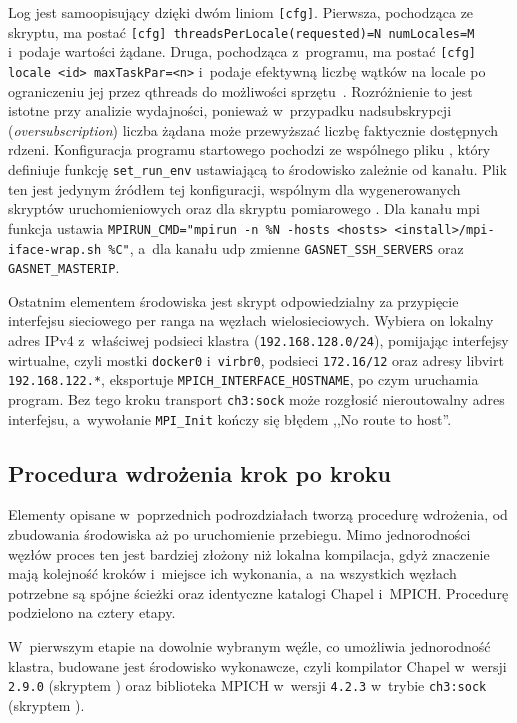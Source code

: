 Log jest samoopisujący dzięki dwóm liniom \texttt{[cfg]}. Pierwsza, pochodząca ze skryptu, ma postać \texttt{[cfg] threadsPerLocale(requested)=N numLocales=M} i~podaje wartości żądane. Druga, pochodząca z~programu, ma postać \texttt{[cfg] locale <id> maxTaskPar=<n>} i~podaje efektywną liczbę wątków na locale po ograniczeniu jej przez qthreads do możliwości sprzętu~\cite{qthreads}. Rozróżnienie to jest istotne przy analizie wydajności, ponieważ w~przypadku nadsubskrypcji (\emph{oversubscription}) liczba żądana może przewyższać liczbę faktycznie dostępnych rdzeni. Konfiguracja programu startowego pochodzi ze wspólnego pliku , który definiuje funkcję \texttt{set\_run\_env} ustawiającą to środowisko zależnie od kanału. Plik ten jest jedynym źródłem tej konfiguracji, wspólnym dla wygenerowanych skryptów uruchomieniowych oraz dla skryptu pomiarowego . Dla kanału mpi funkcja ustawia \texttt{MPIRUN\_CMD="mpirun -n \%N -hosts <hosts> <install>/mpi-iface-wrap.sh \%C"}, a~dla kanału udp zmienne \texttt{GASNET\_SSH\_SERVERS} oraz \texttt{GASNET\_MASTERIP}.

Ostatnim elementem środowiska jest skrypt  odpowiedzialny za przypięcie interfejsu sieciowego per ranga na węzłach wielosieciowych. Wybiera on lokalny adres IPv4 z~właściwej podsieci klastra (\texttt{192.168.128.0/24}), pomijając interfejsy wirtualne, czyli mostki \texttt{docker0} i~\texttt{virbr0}, podsieci \texttt{172.16/12} oraz adresy libvirt \texttt{192.168.122.*}, eksportuje \texttt{MPICH\_INTERFACE\_HOSTNAME}, po czym uruchamia program. Bez tego kroku transport \texttt{ch3:sock} może rozgłosić nieroutowalny adres interfejsu, a~wywołanie \texttt{MPI\_Init} kończy się błędem ,,No route to host''.

\subsection{Procedura wdrożenia krok po kroku}
\label{sec:depl:procedura}

Elementy opisane w~poprzednich podrozdziałach tworzą procedurę wdrożenia, od zbudowania środowiska aż po uruchomienie przebiegu. Mimo jednorodności węzłów proces ten jest bardziej złożony niż lokalna kompilacja, gdyż znaczenie mają kolejność kroków i~miejsce ich wykonania, a~na wszystkich węzłach potrzebne są spójne ścieżki oraz identyczne katalogi Chapel i~MPICH. Procedurę podzielono na cztery etapy.

W~pierwszym etapie na dowolnie wybranym węźle, co umożliwia jednorodność klastra, budowane jest środowisko wykonawcze, czyli kompilator Chapel w~wersji \texttt{2.9.0} (skryptem ) oraz biblioteka MPICH w~wersji \texttt{4.2.3} w~trybie \texttt{ch3:sock} (skryptem ).

